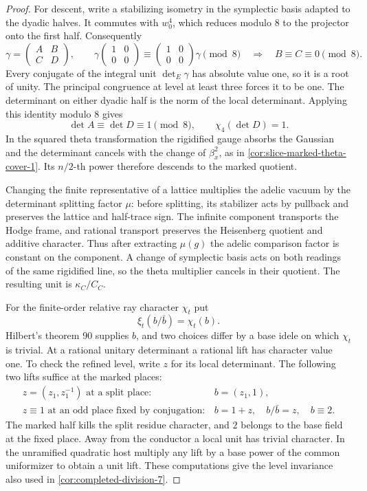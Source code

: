 \begin{proof}
For descent, write a stabilizing isometry in the symplectic
basis adapted to the dyadic halves. It commutes with \(w_0^4\),
which reduces modulo \(8\) to the projector onto the first half.
Consequently
\[
 \gamma=\begin{pmatrix}A&B\\ C&D\end{pmatrix},\qquad
 \gamma\begin{pmatrix}1&0\\0&0\end{pmatrix}
   \equiv\begin{pmatrix}1&0\\0&0\end{pmatrix}\gamma\pmod8
   \quad\Longrightarrow\quad B\equiv C\equiv0\pmod8 .
\]
Every conjugate of the integral unit \(\det_E\gamma\) has
absolute value one, so it is a root of unity. The principal
congruence at level at least three forces it to be one. The
determinant on either dyadic half is the norm of the local
determinant. Applying this identity modulo \(8\) gives
\[
       \det A\equiv\det D\equiv1\pmod8,\qquad \chi_4(\det D)=1 .
\]
In the squared theta transformation the rigidified gauge
absorbs the Gaussian and the determinant cancels with the
change of \(\beta_x^2\), as in
\ref{cor:slice-marked-theta-cover-1}. Its \(n/2\)-th power
therefore descends to the marked quotient.

Changing the finite representative of a lattice multiplies the
adelic vacuum by the determinant splitting factor \(\mu\):
before splitting, its stabilizer acts by pullback and preserves
the lattice and half-trace sign. The infinite component transports
the Hodge frame, and rational transport preserves the Heisenberg
quotient and additive character. Thus after extracting \(\mu(g)\)
the adelic comparison factor is constant on the component. A change
of symplectic basis acts on both readings of the same rigidified
line, so the theta multiplier cancels in their quotient. The
resulting unit is \(\kappa_C/C_C\).

For the finite-order relative ray character \(\chi_t\) put
\[
       \xi_t(b/\bar b)=\chi_t(b).
\]
Hilbert's theorem 90 supplies \(b\), and two choices differ by a
base idele on which \(\chi_t\) is trivial. At a rational unitary determinant a rational lift has
character value one. To check the refined level, write \(z\)
for its local determinant. The following two lifts suffice at
the marked places:
\[
 \begin{array}{ll}
 z=(z_1,z_1^{-1})\text{ at a split place}:&
 b=(z_1,1),\\
 z\equiv1\text{ at an odd place fixed by conjugation}:&
 b=1+z,\quad b/\bar b=z,\quad b\equiv2 .
 \end{array}
\]
The marked half kills the split residue character, and \(2\)
belongs to the base field at the fixed place. Away from the
conductor a local unit has trivial character. In the unramified
quadratic host multiply any lift by a base power of the common
uniformizer to obtain a unit lift. These computations give the
level invariance also used in \ref{cor:completed-division-7}.


\end{proof}

